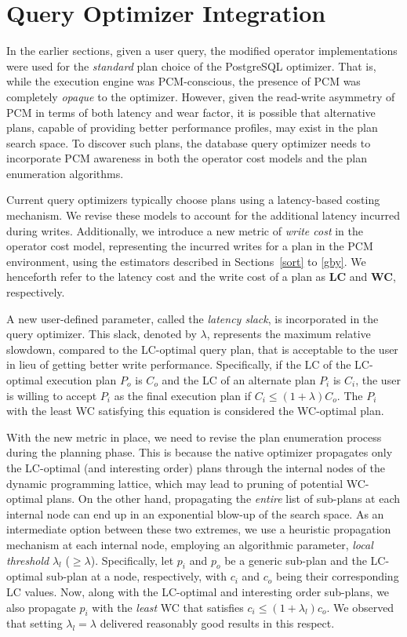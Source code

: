 \section{Query Optimizer Integration}
\label{integration}

In the earlier sections, given a user query, the modified operator
implementations were used for the \emph{standard} plan choice
of the PostgreSQL optimizer. That is, while the execution engine was PCM-conscious,
the presence of PCM was completely \emph{opaque} to the optimizer.
However, given the read-write asymmetry of PCM in terms of both latency and wear
factor, it is possible that alternative plans, capable of providing better
performance profiles, may exist in the plan search space. To discover
such plans, the database query optimizer needs to incorporate PCM
awareness in both the operator cost models and the plan enumeration
algorithms.

Current query optimizers typically choose plans using a latency-based
costing mechanism. We revise these models to account for the additional
latency incurred during writes. Additionally, we introduce a new metric of
\emph{write cost} in the operator cost model, representing the incurred
writes for a plan in the PCM environment, using the estimators described in Sections~\ref{sort}
to \ref{gby}. We henceforth refer to the latency cost and the write cost
of a plan as {\bf LC} and {\bf WC}, respectively.

A new user-defined parameter, called the \emph{latency slack}, is
incorporated in the query optimizer.  This slack, denoted by $\lambda$,
represents the maximum relative slowdown, compared to the LC-optimal
query plan, that is acceptable to the user in lieu of getting better
write performance. Specifically, if the LC of the LC-optimal execution
plan $P_o$ is $C_o$ and the LC of an alternate plan $P_i$ is $C_i$, the
user is willing to accept $P_i$ as the final execution plan if $C_i \le
(1+\lambda) C_o$. The $P_i$ with the least WC satisfying this equation
is considered the WC-optimal plan.

With the new metric in place, we need to revise the plan enumeration
process during the planning phase. This is because the native optimizer
propagates only the LC-optimal (and interesting order) plans through
the internal nodes of the dynamic programming lattice, which may lead
to pruning of potential WC-optimal plans. On the other hand, propagating
the \emph{entire} list of sub-plans at each internal node can end up in
an exponential blow-up of the search space.  As an intermediate option between these
two extremes, we use a heuristic propagation mechanism at each internal
node, employing an algorithmic parameter, \emph{local threshold} $\lambda_l$
($\ge\lambda$). Specifically, let $p_i$ and $p_o$ be a generic sub-plan and the LC-optimal
sub-plan at a node, respectively, with $c_i$ and $c_o$ being their
corresponding LC values. Now, along with the LC-optimal and interesting
order sub-plans, we also propagate $p_i$ with the \emph{least} WC that
satisfies $c_i \le (1+\lambda_l) c_o$. We observed that
setting $\lambda_l = \lambda$ delivered reasonably good results in this respect.

